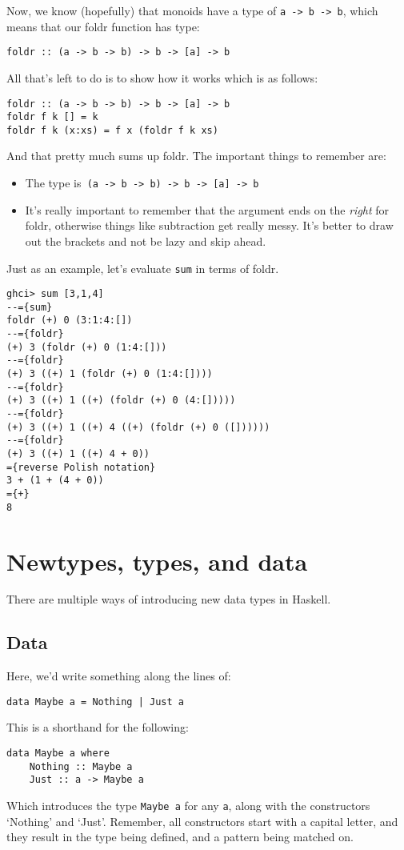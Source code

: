 \documentclass[11pt,a4paper,titlepage,dvipsnames,cmyk]{scrartcl}
\begin{document}
Now, we know (hopefully) that monoids have a type of \lstinline|a -> b -> b|,
which means that our foldr function has type:
\begin{lstlisting}[style=B]
foldr :: (a -> b -> b) -> b -> [a] -> b
\end{lstlisting}

All that's left to do is to show how it works which is as follows:
\begin{lstlisting}[style=B]
foldr :: (a -> b -> b) -> b -> [a] -> b
foldr f k [] = k
foldr f k (x:xs) = f x (foldr f k xs)
\end{lstlisting}

And that pretty much sums up foldr. The important things to remember are:
\begin{itemize}
    \item The type is\lstinline| (a -> b -> b) -> b -> [a] -> b|
        \item It's really important to remember that the argument ends on
            the
        \textit{right} for foldr, otherwise things like subtraction get
            really messy. It's better to draw out the brackets and not be
            lazy and skip ahead.
\end{itemize}

Just as an example, let's evaluate \lstinline|sum| in terms of foldr.
\begin{lstlisting}[style=B]
ghci> sum [3,1,4]
--={sum}
foldr (+) 0 (3:1:4:[])
--={foldr}
(+) 3 (foldr (+) 0 (1:4:[]))
--={foldr}
(+) 3 ((+) 1 (foldr (+) 0 (1:4:[])))
--={foldr}
(+) 3 ((+) 1 ((+) (foldr (+) 0 (4:[]))))
--={foldr}
(+) 3 ((+) 1 ((+) 4 ((+) (foldr (+) 0 ([])))))
--={foldr}
(+) 3 ((+) 1 ((+) 4 + 0))
={reverse Polish notation}
3 + (1 + (4 + 0))
={+}
8
\end{lstlisting}

\section{Newtypes, types, and data}%
\label{sec:newtypes}
There are multiple ways of introducing new data types in Haskell.
\subsection{Data}%
\label{sub:Data}
Here, we'd write something along the lines of:
\begin{lstlisting}[style=B]
data Maybe a = Nothing | Just a
\end{lstlisting}
This is a shorthand for the following:
\begin{lstlisting}[style=B]
data Maybe a where
    Nothing :: Maybe a
    Just :: a -> Maybe a
\end{lstlisting}
Which introduces the type \lstinline|Maybe a| for any \lstinline|a|, along
with the constructors `Nothing' and `Just'. Remember, all constructors
start with a capital letter, and they result in the type being defined,
and a pattern being matched on.
\end{document}
